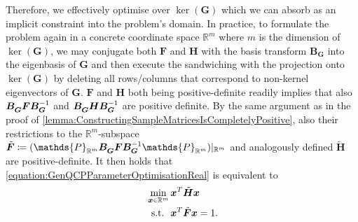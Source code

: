 \documentclass[10pt,conference]{IEEEtran}
\newcommand*{\R}{\mathbb{R}}          %
\newcommand*{\transpose}{T}           %
\newcommand*{\projection}{\mathds{P}} %
\newcommand*{\scriptin}{\raisebox{0.15ex}{$\scriptscriptstyle \in$}}
\newcommand*{\deepscriptin}{\raisebox{0.1ex}{$\scriptscriptstyle \in$}}
\newcommand*{\mathhphantomdisplay}[2]{\mathmakebox[\widthof{$\displaystyle #1$}][l]{#2}}
\begin{document}
Therefore, we effectively optimise over $\ker(\bm{G})$ which we can absorb as an implicit constraint into the problem's domain.
In practice, to formulate the problem again in a concrete coordinate space $\R^{m}$ where $m$ is the dimension of $\ker(\bm{G})$, we may conjugate both $\bm{F}$ and $\bm{H}$ with the basis transform $\bm{B}_{\bm{G}}$ into the eigenbasis of $\bm{G}$ and then execute the sandwiching with the projection onto $\ker(\bm{G})$ by deleting all rows/columns that correspond to non-kernel eigenvectors of $\bm{G}$.
$\bm{F}$ and $\bm{H}$ both being positive-definite readily implies that also $\bm{B}_{\bm{G}}^{\vphantom{-1}} \bm{F} \bm{B}_{\bm{G}}^{-1}$ and $\bm{B}_{\bm{G}}^{\vphantom{-1}} \bm{H} \bm{B}_{\bm{G}}^{-1}$ are positive definite.
By the same argument as in the proof of \autoref{lemma:ConstructingSampleMatricesIsCompletelyPositive}, also their restrictions to the $\R^{m}$-subspace $\tilde{\bm{F}} \coloneqq (\projection_{\R^{m}} \bm{B}_{\bm{G}}^{\vphantom{-1}}\bm{F} \bm{B}_{\bm{G}}^{-1} \projection_{\R^{m}})\vert_{\R^{m}}$ and analogously defined $\tilde{\bm{H}}$ are positive-definite.
It then holds that \eqref{equation:GenQCPParameterOptimisationReal} is equivalent to
\begin{align}\label{equation:GenQCPParameterOptimisationRealImplicit}
    \begin{split}
        &\min_{\bm{x} \scriptin \R^{m}} \bm{x}^{\transpose} \tilde{\bm{H}} \bm{x} \\
        &\mathhphantomdisplay{\min_{\bm{x} \deepscriptin \R^{m}}}{\ \, \text{s.t.}}\ \bm{x}^{\transpose} \tilde{\bm{F}} \bm{x} = 1.
    \end{split}
\end{align}
\end{document}
